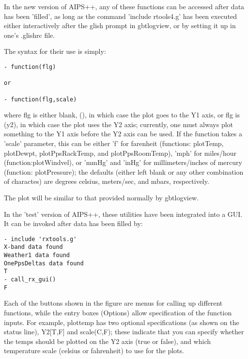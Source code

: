 In the new version of AIPS++, 
any of these functions can be accessed after data has been 'filled', as long
as the command 'include rtools4.g' has been executed either interactively
after the glish prompt in gbtlogview, or by setting it up in one's 
.glishrc file.

The syntax for their use is simply:

\begin{verbatim}
- function(flg)

or

- function(flg,scale)
\end{verbatim}

where flg is either blank, (), in which case the plot goes to the Y1 axis,
or flg is (y2), in which case the plot uses the Y2 axis; currently, one
must always plot something to the Y1 axis before the Y2 axis can be used.
If the function takes a 'scale' parameter, this can be either 'f' for
farenheit (functions: plotTemp, plotDewpt, plotPpsRackTemp, and
plotPpsRoomTemp), 'mph' for miles/hour (function:plotWindvel), or
'mmHg' and 'inHg' for millimeters/inches of mercury (function: 
plotPressure); the defaults (either left blank or any other combination
of charactes) are degrees celsius, meters/sec, and mbars, respectively.

The plot will be similar to that provided normally by gbtlogview.

In the 'test' version of AIPS++, these utilities have been integrated 
into a GUI. It can be invoked after data has been filled by:

\begin{verbatim}
- include 'rxtools.g'
X-band data found
Weather1 data found
OnePpsDeltas data found
T 
- call_rx_gui()
F 
\end{verbatim}

Each of the buttons shown in the figure are menus for calling up different
functions, while the entry boxes (Options) allow specification of the 
function inputs. For example, plottemp has two optional specifications
(as shown on the status line), Y2[T,F] and scale(C,F); these indicate
that you can specify whether the temps should be plotted on the Y2 axis
(true or false), and which temperature scale (celsius or fahrenheit) to
use for the plots.

\begin{figure}
\begin{flushleft}
\end{flushleft}
\end{figure}

\begin{figure}
\begin{flushleft}
\end{flushleft}
\end{figure}
%


